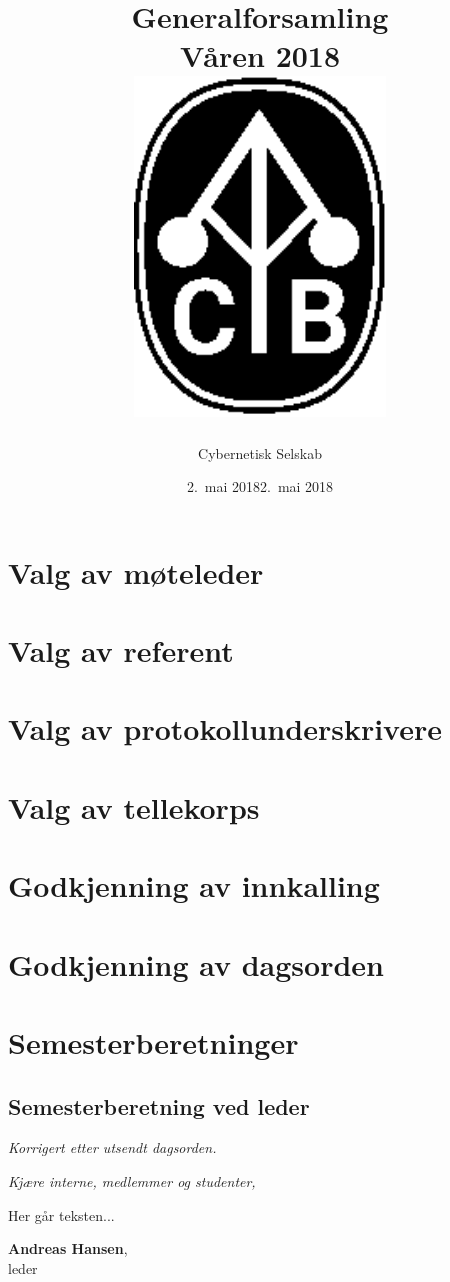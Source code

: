\documentclass[10pt,norsk,a4paper]{article}
\title{Generalforsamling \\
	Våren 2018\\[3cm]
	\includegraphics[width=0.5\textwidth]{cyb-logo.eps}\\[-.5cm]}
\date{2.\ mai 2018}
\author{Cybernetisk Selskab}
\begin{document}
\maketitle{}
\newpage
\tableofcontents{}


\section{Valg av møteleder}

\section{Valg av referent}

\section{Valg av protokollunderskrivere}

\section{Valg av tellekorps}

\section{Godkjenning av innkalling}

\section{Godkjenning av dagsorden}

\section{Semesterberetninger}
\subsection{Semesterberetning ved leder}
\textit{\small Korrigert etter utsendt dagsorden.}

\textit{Kjære interne, medlemmer og studenter,}
\begin{multicols}{2}

	Her går teksten...

\end{multicols}

\textbf{Andreas Hansen},\\
leder \\
\date{2.\ mai 2018}
\newpage
\end{document}
